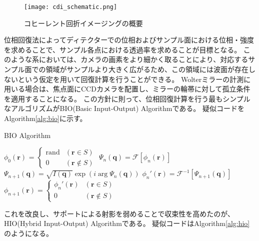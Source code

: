 \begin{figure}[!ht]
\centering
\texttt{[image: cdi\_schematic.png]}
\caption{コヒーレント回折イメージングの概要}
\label{fig:cdi_schematic}
\end{figure}

位相回復法によってディテクターでの位相およびサンプル面における位相・強度を求めることで、サンプル各点における透過率を求めることが目標となる。
このような系においては、カメラの画素をより細かく取ることにより、対応するサンプル面での領域がサンプルより大きく広がるため、この領域には波面が存在しないという仮定を用いて回復計算を行うことができる。
Wolterミラーの計測に用いる場合は、焦点面にCCDカメラを配置し、ミラーの輪帯に対して孤立条件を適用することになる。
この方針に則って、位相回復計算を行う最もシンプルなアルゴリズムがBIO(Basic Input-Output) Algorithmである。
疑似コードをAlgorithm\ref{alg:bio}に示す。

\newcommand{\pos} {
    \mathbf{r}
}
\newcommand{\rpos} {
    \mathbf{q}
}

\begin{algorithm}                      
\caption{BIO Algorithm}         
\label{alg:bio}                          
\begin{algorithmic}
    \STATE $\phi_0(\pos)$
      = $\begin{cases}
        \mathrm{rand} & (\pos \in S) \\
        0 & (\pos \notin S)
      \end{cases}$
    \STATE $\Psi_n(\rpos) = \mathcal F [\phi_n(\pos)]$
    \STATE $\Psi_{n+1}(\rpos) = \sqrt{I(\rpos)} \exp \left( i \arg \Psi_n(\rpos) \right)$ 
    \STATE $\phi_n'(\pos) = \mathcal F^{-1} [\Psi_{n+1}(\rpos)]$
    \STATE $\phi_{n+1}(\pos)
      = \begin{cases}
          \phi_n'(\pos) & (\pos \in S) \\
          0 & (\pos \notin S)
      \end{cases}$
    \ENDFOR
\end{algorithmic}
\end{algorithm}

これを改良し、サポートによる射影を弱めることで収束性を高めたのが、HIO(Hybrid Input-Output) Algorithmである。
疑似コードはAlgorithm\ref{alg:hio}のようになる。

